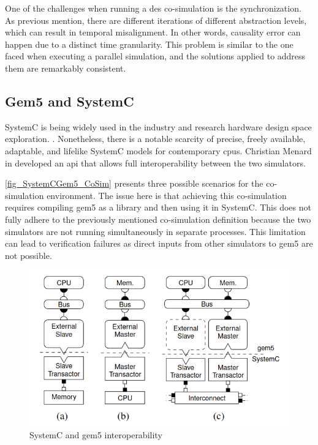 One of the challenges when running a \gls{des} co-simulation is the synchronization. As previous mention, there are different iterations of different abstraction levels, which can result in temporal misalignment. In other words, causality error can happen due to a distinct time granularity. This problem is similar to the one faced when executing a parallel simulation, and the solutions applied to address them are remarkably consistent. 


\subsection{Gem5 and SystemC}

SystemC is being widely used in the industry and research hardware design space exploration. \cite{menard2017system}. Nonetheless, there is a notable scarcity of precise, freely available, adaptable, and lifelike SystemC models for contemporary \glspl{cpu}. Christian Menard in \cite{menard2017system} developed an \gls{api} that allows full interoperability between the two simulators. 

\autoref{fig_SystemCGem5_CoSim} presents three possible scenarios for the co-simulation environment. The issue here is that achieving this co-simulation requires compiling gem5 as a library and then using it in SystemC. This does not fully adhere to the previously mentioned co-simulation definition because the two simulators are not running simultaneously in separate processes. This limitation can lead to verification failures as direct inputs from other simulators to gem5 are not possible.

\begin{figure}[H]
	\centering
 	\includegraphics[width=0.7\linewidth]{Images/SystemCGem5_CoSim.png}
 	\caption{SystemC and gem5 interoperability \cite{menard2017system}}
	 \label{fig_SystemCGem5_CoSim}
\end{figure}
